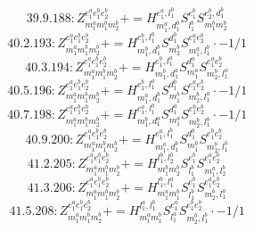 \documentclass[letterpaper,10pt,fleqn,leqno,onecolumn]{article}
\begin{document}
\begin{equation} \;\;\;\;\;\;  39.9.188: Z^{e_{1}^{a}e_{1}^{b}e_{2}^{b}}_{m_{1}^{a}m_{1}^{b}m_{2}^{b}}+=H^{e_{1}^{a},l_{1}^{b}}_{m_{1}^{a},d_{1}^{b}}S^{e_{1}^{b}}_{l_{1}^{b}}S^{e_{2}^{b},d_{1}^{b}}_{m_{1}^{b}m_{2}^{b}} \end{equation}
\begin{equation} \;\;\;\;\;\;  40.2.193: Z^{e_{1}^{a}e_{1}^{b}e_{2}^{b}}_{m_{1}^{a}m_{1}^{b}m_{2}^{b}}+=H^{e_{1}^{b},l_{1}^{b}}_{m_{1}^{b},d_{1}^{b}}S^{d_{1}^{b}}_{m_{2}^{b}}S^{e_{1}^{a}e_{2}^{b}}_{m_{1}^{a},l_{1}^{b}}\cdot -1/1 \end{equation}
\begin{equation} \;\;\;\;\;\;  40.3.194: Z^{e_{1}^{a}e_{1}^{b}e_{2}^{b}}_{m_{1}^{a}m_{1}^{b}m_{2}^{b}}+=H^{e_{1}^{b},l_{1}^{a}}_{m_{1}^{b},d_{1}^{a}}S^{d_{1}^{a}}_{m_{1}^{a}}S^{e_{1}^{a}e_{2}^{b}}_{m_{2}^{b},l_{1}^{a}} \end{equation}
\begin{equation} \;\;\;\;\;\;  40.5.196: Z^{e_{1}^{a}e_{1}^{b}e_{2}^{b}}_{m_{1}^{a}m_{1}^{b}m_{2}^{b}}+=H^{e_{1}^{b},l_{1}^{a}}_{m_{1}^{a},d_{1}^{b}}S^{d_{1}^{b}}_{m_{1}^{b}}S^{e_{1}^{a}e_{2}^{b}}_{m_{2}^{b},l_{1}^{a}}\cdot -1/1 \end{equation}
\begin{equation} \;\;\;\;\;\;  40.7.198: Z^{e_{1}^{a}e_{1}^{b}e_{2}^{b}}_{m_{1}^{a}m_{1}^{b}m_{2}^{b}}+=H^{e_{1}^{a},l_{1}^{b}}_{m_{1}^{b},d_{1}^{a}}S^{d_{1}^{a}}_{m_{1}^{a}}S^{e_{1}^{b}e_{2}^{b}}_{m_{2}^{b},l_{1}^{b}}\cdot -1/1 \end{equation}
\begin{equation} \;\;\;\;\;\;  40.9.200: Z^{e_{1}^{a}e_{1}^{b}e_{2}^{b}}_{m_{1}^{a}m_{1}^{b}m_{2}^{b}}+=H^{e_{1}^{a},l_{1}^{b}}_{m_{1}^{a},d_{1}^{b}}S^{d_{1}^{b}}_{m_{1}^{b}}S^{e_{1}^{b}e_{2}^{b}}_{m_{2}^{b},l_{1}^{b}} \end{equation}
\begin{equation} \;\;\;\;\;\;  41.2.205: Z^{e_{1}^{a}e_{1}^{b}e_{2}^{b}}_{m_{1}^{a}m_{1}^{b}m_{2}^{b}}+=H^{l_{1}^{b},l_{2}^{b}}_{m_{1}^{b}m_{2}^{b}}S^{e_{1}^{b}}_{l_{1}^{b}}S^{e_{1}^{a}e_{2}^{b}}_{m_{1}^{a},l_{2}^{b}} \end{equation}
\begin{equation} \;\;\;\;\;\;  41.3.206: Z^{e_{1}^{a}e_{1}^{b}e_{2}^{b}}_{m_{1}^{a}m_{1}^{b}m_{2}^{b}}+=H^{l_{1}^{b},l_{1}^{a}}_{m_{1}^{a}m_{1}^{b}}S^{e_{1}^{b}}_{l_{1}^{b}}S^{e_{1}^{a}e_{2}^{b}}_{m_{2}^{b},l_{1}^{a}} \end{equation}
\begin{equation} \;\;\;\;\;\;  41.5.208: Z^{e_{1}^{a}e_{1}^{b}e_{2}^{b}}_{m_{1}^{a}m_{1}^{b}m_{2}^{b}}+=H^{l_{1}^{a},l_{1}^{b}}_{m_{1}^{a}m_{1}^{b}}S^{e_{1}^{a}}_{l_{1}^{a}}S^{e_{1}^{b}e_{2}^{b}}_{m_{2}^{b},l_{1}^{b}}\cdot -1/1 \end{equation}
\end{document}
